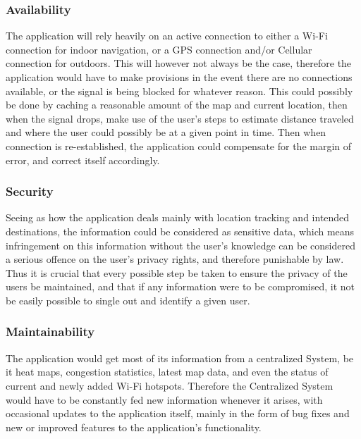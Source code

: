 \documentclass[12pt]{article}
\begin{document}
		

		\subsubsection{Availability}

		The application will rely heavily on an active connection to either a Wi-Fi connection for indoor navigation, or a GPS connection and/or Cellular connection for outdoors.  This will however not always be the case, therefore the application would have to make provisions in the event there are no connections available, or the signal is being blocked for whatever reason.  This could possibly be done by caching a reasonable amount of the map and current location, then when the signal drops, make use of the user’s steps to estimate distance traveled and where the user could possibly be at a given point in time.  Then when connection is re-established, the application could compensate for the margin of error, and correct itself accordingly.  

		

		\subsubsection{Security}

		Seeing as how the application deals mainly with location tracking and intended destinations, the information could be considered as sensitive data, which means infringement on this information without the user’s knowledge can be considered a serious offence on the user’s privacy rights, and therefore punishable by law.  Thus it is crucial that every possible step be taken to ensure the privacy of the users be maintained, and that if any information were to be compromised, it not be easily possible to single out and identify a given user.  

		

		\subsubsection{Maintainability}

		The application would get most of its information from a centralized System, be it heat maps, congestion statistics, latest map data, and even the status of current and newly added Wi-Fi hotspots.  Therefore the Centralized System would have to be constantly fed new information whenever it arises, with occasional updates to the application itself, mainly in the form of bug fixes and new or improved features to the application’s functionality.  
\end{document}
